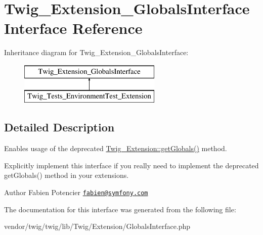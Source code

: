 \hypertarget{interfaceTwig__Extension__GlobalsInterface}{}\section{Twig\+\_\+\+Extension\+\_\+\+Globals\+Interface Interface Reference}
\label{interfaceTwig__Extension__GlobalsInterface}
Inheritance diagram for Twig\+\_\+\+Extension\+\_\+\+Globals\+Interface\+:\begin{figure}[H]
\begin{center}
\leavevmode
\includegraphics[height=2.000000cm]{interfaceTwig__Extension__GlobalsInterface}
\end{center}
\end{figure}


\subsection{Detailed Description}
Enables usage of the deprecated \hyperlink{classTwig__Extension_aec459d056e5afa3b4a3feb2b67e2190a}{Twig\+\_\+\+Extension\+::get\+Globals()} method.

Explicitly implement this interface if you really need to implement the deprecated get\+Globals() method in your extensions.

\begin{DoxyAuthor}{Author}
Fabien Potencier \href{mailto:fabien@symfony.com}{\tt fabien@symfony.\+com} 
\end{DoxyAuthor}


The documentation for this interface was generated from the following file\+:\begin{DoxyCompactItemize}
\item 
vendor/twig/twig/lib/\+Twig/\+Extension/Globals\+Interface.\+php\end{DoxyCompactItemize}
